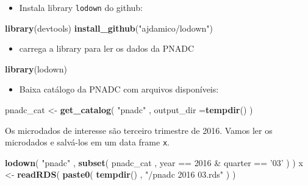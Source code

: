 \documentclass[]{book}
\newenvironment{Shaded}{\begin{snugshade}}{\end{snugshade}}
\newcommand{\KeywordTok}[1]{\textcolor[rgb]{0.13,0.29,0.53}{\textbf{{#1}}}}
\newcommand{\DataTypeTok}[1]{\textcolor[rgb]{0.13,0.29,0.53}{{#1}}}
\newcommand{\DecValTok}[1]{\textcolor[rgb]{0.00,0.00,0.81}{{#1}}}
\newcommand{\StringTok}[1]{\textcolor[rgb]{0.31,0.60,0.02}{{#1}}}
\newcommand{\NormalTok}[1]{{#1}}
\providecommand{\tightlist}{%
  \setlength{\itemsep}{0pt}\setlength{\parskip}{0pt}}
\theoremstyle{definition}
\theoremstyle{definition}
\theoremstyle{remark}
\begin{document}
\begin{itemize}
\tightlist
\item
  Instala library \texttt{lodown} \citep{R-lodown} do github:
\end{itemize}

\begin{Shaded}
\begin{Highlighting}[]
\KeywordTok{library}\NormalTok{(devtools)}
\KeywordTok{install_github}\NormalTok{(}\StringTok{"ajdamico/lodown"}\NormalTok{)}
\end{Highlighting}
\end{Shaded}

\begin{itemize}
\tightlist
\item
  carrega a library para ler os dados da PNADC
\end{itemize}

\begin{Shaded}
\begin{Highlighting}[]
\KeywordTok{library}\NormalTok{(lodown)}
\end{Highlighting}
\end{Shaded}

\begin{itemize}
\tightlist
\item
  Baixa catálogo da PNADC com arquivos disponíveis:
\end{itemize}

\begin{Shaded}
\begin{Highlighting}[]
\NormalTok{pnadc_cat <-}\StringTok{ }\KeywordTok{get_catalog}\NormalTok{( }\StringTok{"pnadc"} \NormalTok{, }\DataTypeTok{output_dir =}\KeywordTok{tempdir}\NormalTok{() )}
\end{Highlighting}
\end{Shaded}

Os microdados de interesse são terceiro trimestre de 2016. Vamos ler os
microdados e salvá-los em um data frame \texttt{x}.

\begin{Shaded}
\begin{Highlighting}[]
\KeywordTok{lodown}\NormalTok{( }\StringTok{"pnadc"} \NormalTok{, }\KeywordTok{subset}\NormalTok{( pnadc_cat , year ==}\StringTok{ }\DecValTok{2016} \NormalTok{&}\StringTok{ }\NormalTok{quarter ==}\StringTok{ '03'} \NormalTok{) )}
\NormalTok{x <-}\StringTok{ }\KeywordTok{readRDS}\NormalTok{( }\KeywordTok{paste0}\NormalTok{( }\KeywordTok{tempdir}\NormalTok{() , }\StringTok{"/pnadc 2016 03.rds"} \NormalTok{) )}
\end{Highlighting}
\end{Shaded}
\end{document}
